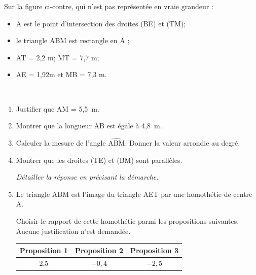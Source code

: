 \documentclass[exercice,a4]{thedocument}%
\begin{document}
%
\providecommand{\degres}{^\circ}%
\begin{minipage}{0.45\linewidth}
	Sur la figure ci-contre, qui n'est pas représentée en vraie grandeur :
	\begin{itemize}
		\item A est le point d'intersection des droites (BE) et (TM);
		\item le triangle ABM est rectangle en A ;
		\item AT = 2,2 m; MT = 7,7 m;
		\item AE = 1,92m et MB = 7,3 m.
	\end{itemize}
\end{minipage}\hfill~
\medskip

\begin{enumerate}
	\item Justifier que AM = 5,5~m.

	\item Montrer que la longueur AB est égale à 4,8~m.

	\item Calculer la mesure de l'angle $\widehat{\text{ABM}}$. Donner la valeur arrondie au degré.

	\item Montrer que les droites (TE) et (BM) sont parallèles.

	\textit{Détailler la réponse en précisant la démarche.}

	\item Le triangle ABM est l'image du triangle AET par une homothétie de centre A.

	Choisir le rapport de cette homothétie parmi les propositions suivantes. Aucune justification n'est demandée.

	\begin{center}
		\begin{tabular}{|c|c|c|}
			\hline
			\textbf{Proposition 1} & \textbf{Proposition 2} & \textbf{Proposition 3} \\
			\hline
			2,5 & $-0,4$ & $-2,5$ \\
			\hline
		\end{tabular}
	\end{center}
\end{enumerate}

\medskip
\showthesource
\end{document}
